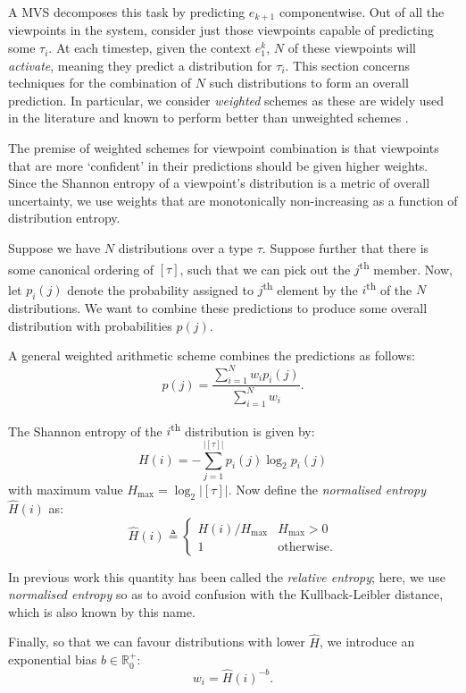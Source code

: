 \documentclass[12pt,a4paper,twoside,openright]{report}
\begin{document}
A MVS decomposes this task by predicting $e_{k+1}$ componentwise. Out of all the
viewpoints in the system, consider just those viewpoints capable of predicting
some $\tau_i$. At each timestep, given the context $e_1^k$, $N$ of these
viewpoints will \emph{activate}, meaning they predict a distribution for
$\tau_i$. This section concerns techniques for the combination of $N$ such
distributions to form an overall prediction. In particular, we consider
\emph{weighted} schemes as these are widely used in the literature and known to
perform better than unweighted schemes \cite{pearce2004combining}.

The premise of weighted schemes for viewpoint combination is that viewpoints
that are more `confident' in their predictions should be given higher weights.
Since the Shannon entropy of a viewpoint's distribution is a metric of overall
uncertainty, we use weights that are monotonically non-increasing as a function
of distribution entropy.

Suppose we have $N$ distributions over a type $\tau$. Suppose further that there
is some canonical ordering of $[\tau]$, such that we can pick out the
$j$\textsuperscript{th} member. Now, let $p_i(j)$ denote the probability
assigned to $j$\textsuperscript{th} element by the $i$\textsuperscript{th} of the
$N$ distributions. We want to combine these predictions to produce some overall
distribution with
probabilities $p(j)$.

A general weighted arithmetic scheme combines the predictions as follows:
$$
  p(j) = \frac{ \sum_{i = 1}^N w_i p_i(j) }{ \sum_{i = 1}^N w_i }.
$$

The Shannon entropy of the $i$\textsuperscript{th} distribution is given by:
$$ H(i) = - \sum_{j = 1}^{|[\tau]|} p_i(j) \log_2 p_i(j) $$
with maximum value $H_{\mathrm{max}} = \log_2{ |[\tau]| }$. Now define the
\emph{normalised entropy} $\hat{H}(i)$ as:
$$ \hat{H}(i) \triangleq \begin{cases}
  H(i)/H_{\mathrm{max}} & H_{\mathrm{max}} > 0 \\
  1 & \text{otherwise.}
\end{cases} $$

In previous work this quantity has been called the \emph{relative entropy};
here, we use \emph{normalised entropy} so as to avoid confusion with the
Kullback-Leibler distance, which is also known by this name.

Finally, so that we can favour distributions with lower $\hat{H}$, we introduce
an exponential bias $b \in \mathbb{R}_0^+$:
$$ w_i = \hat{H}(i)^{-b}. $$
\end{document}
